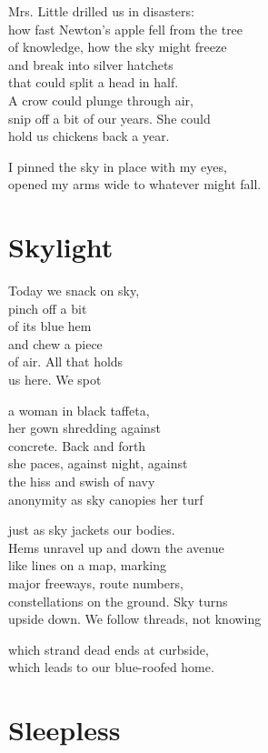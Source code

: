 \documentclass[twoside,10pt]{book}
\begin{document}
Mrs. Little drilled us in disasters:\\
how fast Newton's apple fell from the tree\\
of knowledge, how the sky might freeze\\
and break into silver hatchets\\
that could split a head in half.\\
A crow could plunge through air,\\
snip off a bit of our years. She could\\
hold us chickens back a year.

I pinned the sky in place with my eyes,\\
opened my arms wide to whatever might fall.


\clearpage
\section{Skylight}

Today we snack on sky,\\
pinch off a bit\\
of its blue hem\\
and chew a piece\\
of air. All that holds\\
us here. We spot

a woman in black taffeta,\\
her gown shredding against\\
concrete. Back and forth\\
she paces, against night, against\\
the hiss and swish of navy\\
anonymity as sky canopies her turf

just as sky jackets our bodies.\\
Hems unravel up and down the avenue\\
like lines on a map, marking\\
major freeways, route numbers,\\
constellations on the ground. Sky turns\\
upside down. We follow threads, not knowing

which strand dead ends at curbside,\\
which leads to our blue-roofed home.


\clearpage
\section{Sleepless}
\end{document}
